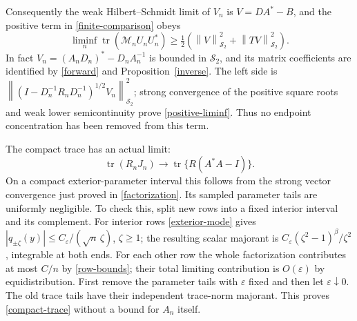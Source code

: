 \documentclass[a4paper,11pt]{amsart}
\theoremstyle{remark}\newtheorem{remark}[theorem]{Remark}
\newcommand{\tr}{\operatorname{tr}}
\newcommand{\HS}{\mathcal S_2}
\newcommand{\norm}[1]{\left\lVert#1\right\rVert}
\begin{document}
Consequently the weak Hilbert--Schmidt limit of $V_n$ is
$V=DA^*-B$, and the positive term in \eqref{finite-comparison} obeys
\begin{equation}\label{positive-liminf}
 \liminf_n\tr(\mathcal M_nU_nU_n^*)
 \ge\tfrac12(\norm V_{\HS}^2+\norm{TV}_{\HS}^2).
\end{equation}
In fact $V_n=(A_nD_n)^*-D_nA_n^{-1}$ is bounded in $\HS$,
and its matrix coefficients are identified by \eqref{forward} and
Proposition~\ref{inverse}. The left side is
$\norm{(I-D_n^{-1}R_nD_n^{-1})^{1/2}V_n}_{\HS}^2$;
strong convergence of the positive square roots and weak lower
semicontinuity prove \eqref{positive-liminf}. Thus no endpoint
concentration has been removed from this term.

The compact trace has an actual limit:
\begin{equation}\label{compact-trace}
 \tr(R_nJ_n)\longrightarrow\tr\{R(A^*A-I)\}.
\end{equation}
On a compact exterior-parameter interval this follows from the
strong vector convergence just proved in \eqref{factorization}.
Its sampled parameter tails are uniformly negligible. To check this,
split new rows into a fixed interior interval and its complement.
For interior rows \eqref{exterior-mode} gives
$|q_{\pm \zeta}(y)|\le C_\varepsilon/(\sqrt n\,\zeta)$, $\zeta\ge1$;
the resulting scalar majorant is
$C_\varepsilon(\zeta^2-1)^\beta/\zeta^2$, integrable at both ends.
For each other row the whole factorization contributes at most
$C/n$ by \eqref{row-bounds}; their total limiting contribution is
$O(\varepsilon)$ by equidistribution. First remove the parameter
tails with $\varepsilon$ fixed and then let $\varepsilon\downarrow0$.
The old trace tails have their independent trace-norm majorant.
This proves \eqref{compact-trace} without a bound for $A_n$ itself.
\end{document}
